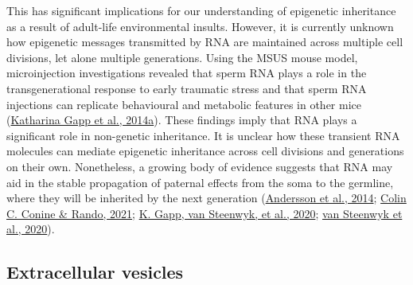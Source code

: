 \documentclass[12pt,twoside]{reedthesis}
\begin{document}
This has significant implications for our understanding of epigenetic
inheritance as a result of adult-life environmental insults. However, it
is currently unknown how epigenetic messages transmitted by RNA are
maintained across multiple cell divisions, let alone multiple
generations. Using the MSUS mouse model, microinjection investigations
revealed that sperm RNA plays a role in the transgenerational response
to early traumatic stress and that sperm RNA injections can replicate
behavioural and metabolic features in other mice (\protect\hyperlink{ref-gapp2014}{Katharina Gapp et al., 2014a}). These
findings imply that RNA plays a significant role in non-genetic
inheritance. It is unclear how these transient RNA molecules can mediate
epigenetic inheritance across cell divisions and generations on their
own. Nonetheless, a growing body of evidence suggests that RNA may aid
in the stable propagation of paternal effects from the soma to the
germline, where they will be inherited by the next generation
(\protect\hyperlink{ref-andersson2014}{Andersson et al., 2014}; \protect\hyperlink{ref-conine2021}{Colin C. Conine \& Rando, 2021}; \protect\hyperlink{ref-gapp2020}{K. Gapp, van Steenwyk, et al., 2020}; \protect\hyperlink{ref-vansteenwyk2020}{van Steenwyk et al., 2020}).

\hypertarget{extracellular-vesicles}{%
\subsection*{Extracellular vesicles}\label{extracellular-vesicles}}
\end{document}
